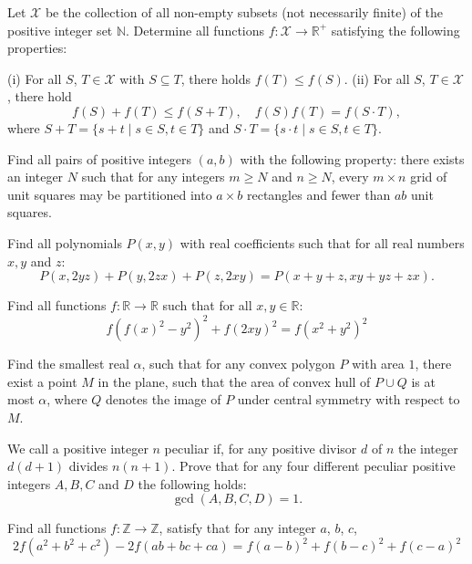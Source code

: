 \documentclass[11pt]{scrartcl}
\begin{document}
\begin{problem}[771297140756048]
	Let $\mathcal{X}$ be the collection of all non-empty subsets (not necessarily finite) of the positive integer set $\mathbb{N}$. Determine all functions $f: \mathcal{X} \to \mathbb{R}^+$ satisfying the following properties:

(i) For all $S$, $T \in \mathcal{X}$ with $S\subseteq T$, there holds $f(T) \le f(S)$.
(ii) For all $S$, $T \in \mathcal{X}$, there hold
\[f(S) + f(T) \le f(S + T),\quad f(S)f(T) = f(S\cdot T), \]where $S + T = \{s + t\mid s\in S, t\in T\}$ and $S \cdot T = \{s\cdot t\mid s\in S, t\in T\}$.
\end{problem}
\begin{problem}[771774560036862]
	Find all pairs of positive integers \((a,b)\) with the following property: there exists an integer \(N\) such that for any integers \(m\ge N\) and \(n\ge N\), every \(m\times n\) grid of unit squares may be partitioned into \(a\times b\) rectangles and fewer than \(ab\) unit squares.
\end{problem}
\begin{problem}[772440252059515]
Find all polynomials $P(x,y)$ with real coefficients such that for all real numbers $x,y$ and $z$:
$$P(x,2yz)+P(y,2zx)+P(z,2xy)=P(x+y+z,xy+yz+zx).$$
\end{problem}
\begin{problem}[773474046332356]
Find all functions $f:\mathbb{R}\rightarrow \mathbb{R}$ such that for all $x,y\in \mathbb{R}$:
$$f\left(f(x)^2-y^2\right)^2+f(2xy)^2=f\left(x^2+y^2\right)^2$$
\end{problem}
\begin{problem}[775468023201224]
Find the smallest real $\alpha$, such that for any convex polygon $P$ with area $1$, there exist a point $M$ in the plane, such that the area of convex hull of $P\cup Q$ is at most $\alpha$, where $Q$ denotes the image of $P$ under central symmetry with respect to $M$.
\end{problem}
\begin{problem}[776638240838060]
	We call a positive integer $n{}$ peculiar if, for any positive divisor $d{}$ of $n{}$ the integer $d(d + 1)$ divides $n(n + 1).$ Prove that for any four different peculiar positive integers $A, B, C$ and $D{}$ the following holds:
\[\gcd(A, B, C, D) = 1.\]
\end{problem}
\begin{problem}[777475822939974]
Find all functions $f:\mathbb {Z}\to\mathbb Z$, satisfy that for any integer ${a}$, ${b}$, ${c}$,
$$2f(a^2+b^2+c^2)-2f(ab+bc+ca)=f(a-b)^2+f(b-c)^2+f(c-a)^2$$
\end{problem}
\end{document}

